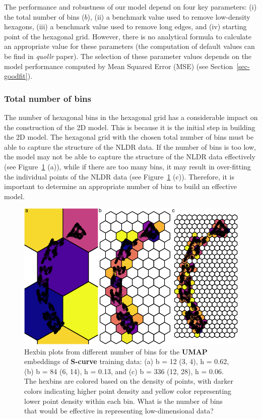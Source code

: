 \documentclass[
  12pt]{article}
\begin{document}
The performance and robustness of our model depend on four key
parameters: (i) the total number of bins (\(b\)), (ii) a benchmark value
used to remove low-density hexagons, (iii) a benchmark value used to
remove long edges, and (iv) starting point of the hexagonal grid.
However, there is no analytical formula to calculate an appropriate
value for these parameters (the computation of default values can be
find in \emph{quollr} paper). The selection of these parameter values
depends on the model performance computed by Mean Squared Error (MSE)
(see Section~\ref{sec-goodfit}).

\hypertarget{total-number-of-bins}{%
\subsubsection{Total number of bins}\label{total-number-of-bins}}

The number of hexagonal bins in the hexagonal grid has a considerable
impact on the construction of the 2D model. This is because it is the
initial step in building the 2D model. The hexagonal grid with the
chosen total number of bins must be able to capture the structure of the
NLDR data. If the number of bins is too low, the model may not be able
to capture the structure of the NLDR data effectively (see
Figure~\ref{fig-binsize} (a)), while if there are too many bins, it may
result in over-fitting the individual points of the NLDR data (see
Figure~\ref{fig-binsize} (c)). Therefore, it is important to determine
an appropriate number of bins to build an effective model.

\begin{figure}[H]

{\centering \includegraphics{paper_files/figure-pdf/fig-binsize-1.pdf}

}

\caption{\label{fig-binsize}Hexbin plots from different number of bins
for the \textbf{UMAP} embeddings of \textbf{S-curve} training data: (a)
b = 12 (3, 4), h = 0.62, (b) b = 84 (6, 14), h = 0.13, and (c) b = 336
(12, 28), h = 0.06. The hexbins are colored based on the density of
points, with darker colors indicating higher point density and yellow
color representing lower point density within each bin. What is the
number of bins that would be effective in representing low-dimensional
data?}

\end{figure}
\end{document}
